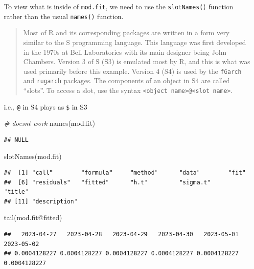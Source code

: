 \documentclass[
]{book}
\newenvironment{Shaded}{\begin{snugshade}}{\end{snugshade}}
\newcommand{\CommentTok}[1]{\textcolor[rgb]{0.56,0.35,0.01}{\textit{#1}}}
\newcommand{\FunctionTok}[1]{\textcolor[rgb]{0.00,0.00,0.00}{#1}}
\newcommand{\NormalTok}[1]{#1}
\newcommand{\SpecialCharTok}[1]{\textcolor[rgb]{0.00,0.00,0.00}{#1}}
\theoremstyle{definition}
\theoremstyle{definition}
\theoremstyle{definition}
\theoremstyle{definition}
\theoremstyle{remark}
\begin{document}
To view what is inside of \texttt{mod.fit}, we need to use the \texttt{slotNames()} function rather than the usual \texttt{names()} function.

\begin{quote}
Most of R and its corresponding packages are written in a form very similar to the S programming language. This language was first developed in the 1970s at Bell Laboratories with its main designer being John Chambers. Version 3 of S (S3) is emulated most by R, and this is what was used primarily before this example. Version 4 (S4) is used by the \texttt{fGarch} and \texttt{rugarch} packages. The components of an object in S4 are called ``slots''. To access a slot, use the syntax \texttt{\textless{}object\ name\textgreater{}@\textless{}slot\ name\textgreater{}}.
\end{quote}

i.e., \texttt{@} in S4 plays as \texttt{\$} in S3

\begin{Shaded}
\begin{Highlighting}[]
\CommentTok{\# doesn\textquotesingle{}t work}
\FunctionTok{names}\NormalTok{(mod.fit)}
\end{Highlighting}
\end{Shaded}

\begin{verbatim}
## NULL
\end{verbatim}

\begin{Shaded}
\begin{Highlighting}[]
\FunctionTok{slotNames}\NormalTok{(mod.fit)}
\end{Highlighting}
\end{Shaded}

\begin{verbatim}
##  [1] "call"        "formula"     "method"      "data"        "fit"        
##  [6] "residuals"   "fitted"      "h.t"         "sigma.t"     "title"      
## [11] "description"
\end{verbatim}

\begin{Shaded}
\begin{Highlighting}[]
\FunctionTok{tail}\NormalTok{(mod.fit}\SpecialCharTok{@}\NormalTok{fitted)}
\end{Highlighting}
\end{Shaded}

\begin{verbatim}
##   2023-04-27   2023-04-28   2023-04-29   2023-04-30   2023-05-01   2023-05-02 
## 0.0004128227 0.0004128227 0.0004128227 0.0004128227 0.0004128227 0.0004128227
\end{verbatim}
\end{document}
